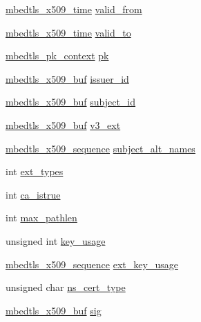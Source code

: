\begin{DoxyCompactItemize}
\item 
\hyperlink{structmbedtls__x509__time}{mbedtls\+\_\+x509\+\_\+time} \hyperlink{structmbedtls__x509__crt_aad3cad5d228545a1950850239741784f}{valid\+\_\+from}
\item 
\hyperlink{structmbedtls__x509__time}{mbedtls\+\_\+x509\+\_\+time} \hyperlink{structmbedtls__x509__crt_a05af94003d5948703ca537b6a5f2d5b4}{valid\+\_\+to}
\item 
\hyperlink{structmbedtls__pk__context}{mbedtls\+\_\+pk\+\_\+context} \hyperlink{structmbedtls__x509__crt_a64f66291338e6b230542d83035fe5f20}{pk}
\item 
\hyperlink{group__x509__module_ga4d02c9e8e4e2934555e0d132cd2976dc}{mbedtls\+\_\+x509\+\_\+buf} \hyperlink{structmbedtls__x509__crt_a6bb2a7142b718fa43b948770ccc98dcd}{issuer\+\_\+id}
\item 
\hyperlink{group__x509__module_ga4d02c9e8e4e2934555e0d132cd2976dc}{mbedtls\+\_\+x509\+\_\+buf} \hyperlink{structmbedtls__x509__crt_adbbaba207a103a73f41b4b72ffc540f5}{subject\+\_\+id}
\item 
\hyperlink{group__x509__module_ga4d02c9e8e4e2934555e0d132cd2976dc}{mbedtls\+\_\+x509\+\_\+buf} \hyperlink{structmbedtls__x509__crt_a6baebf9741097506a60521fbcaf5996b}{v3\+\_\+ext}
\item 
\hyperlink{group__x509__module_gabd52d60a09315854d9ef849d02154f35}{mbedtls\+\_\+x509\+\_\+sequence} \hyperlink{structmbedtls__x509__crt_a1f148e8fb52e03e2604e716386a07df4}{subject\+\_\+alt\+\_\+names}
\item 
int \hyperlink{structmbedtls__x509__crt_a60878e1cb7a3058f19042d8f189158b0}{ext\+\_\+types}
\item 
int \hyperlink{structmbedtls__x509__crt_a196b3a43dae5a1c0058f46075f832890}{ca\+\_\+istrue}
\item 
int \hyperlink{structmbedtls__x509__crt_ab0af43652f426ace28052ec47fdde6fb}{max\+\_\+pathlen}
\item 
unsigned int \hyperlink{structmbedtls__x509__crt_a3b7650600aa6e637b8ab534a938aee94}{key\+\_\+usage}
\item 
\hyperlink{group__x509__module_gabd52d60a09315854d9ef849d02154f35}{mbedtls\+\_\+x509\+\_\+sequence} \hyperlink{structmbedtls__x509__crt_ac94f7360a7143ce1b983fab46c34dcf2}{ext\+\_\+key\+\_\+usage}
\item 
unsigned char \hyperlink{structmbedtls__x509__crt_adc36c60aa279fae8bd35a20b9c2bba22}{ns\+\_\+cert\+\_\+type}
\item 
\hyperlink{group__x509__module_ga4d02c9e8e4e2934555e0d132cd2976dc}{mbedtls\+\_\+x509\+\_\+buf} \hyperlink{structmbedtls__x509__crt_aea76ebaa8c8e23129bd905cdc0242a3a}{sig}

\end{DoxyCompactItemize}
